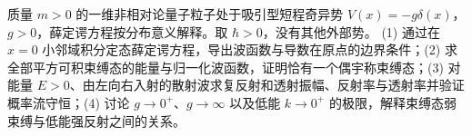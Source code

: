 质量 \(m>0\) 的一维非相对论量子粒子处于吸引型短程奇异势 \(V(x)=-g\delta(x)\)，\(g>0\)，薛定谔方程按分布意义解释。取 \(\hbar>0\)，没有其他外部势。
(1) 通过在 \(x=0\) 小邻域积分定态薛定谔方程，导出波函数与导数在原点的边界条件；(2) 求全部平方可积束缚态的能量与归一化波函数，证明恰有一个偶宇称束缚态；(3) 对能量 \(E>0\)、由左向右入射的散射波求复反射和透射振幅、反射率与透射率并验证概率流守恒；(4) 讨论 \(g\to0^+\)、\(g\to\infty\) 以及低能 \(k\to0^+\) 的极限，解释束缚态弱束缚与低能强反射之间的关系。

